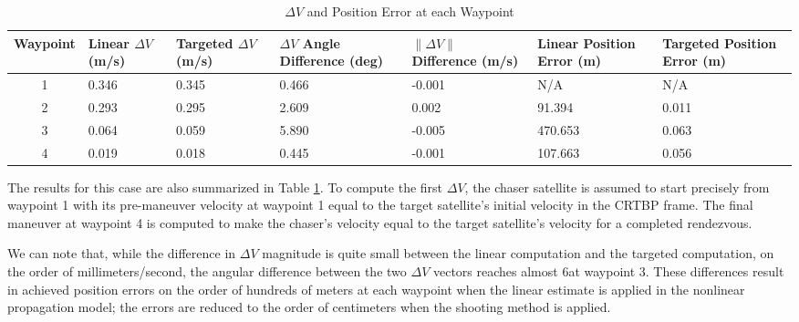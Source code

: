 \documentclass[a4paper]{article}
\begin{document}
\begin{table}[h] 
	\begin{center}
		\begin{tabular}{c p{1cm} p{1cm} p{1.5cm} p{1.5cm} p{1.5cm} p{1.5cm}}
			\toprule
			Waypoint   & Linear \(\Delta V\) (m/s) & Targeted \(\Delta V\) (m/s) & \(\Delta V\) Angle Difference (deg) & \(\|\Delta V \|\) Difference (m/s) & Linear Position Error (m) & Targeted Position Error (m) \\
			\midrule
			1 & 0.346 &	0.345 &	0.466 &	-0.001 &	N/A &	N/A \\
			2 & 0.293 &	0.295 &	2.609 &	0.002 &	91.394 &	0.011 \\
			3 & 0.064 &	0.059 &	5.890 &	-0.005 &	470.653 &	0.063 \\
			4 & 0.019 &	0.018 &	0.445 &	-0.001 &	107.663 &	0.056 \\
			\bottomrule
		\end{tabular}
		\caption{\(\Delta V\) and Position Error at each Waypoint}
		\label{tab:Results_1}
	\end{center}
\end{table}

The results for this case are also summarized in Table \ref{tab:Results_1}.  To compute the first \(\Delta V\), the chaser satellite is assumed to start precisely from waypoint 1 with its pre-maneuver velocity at waypoint 1 equal to the target satellite's initial velocity in the CRTBP frame.  The final maneuver at waypoint 4 is computed to make the chaser's velocity equal to the target satellite's velocity for a completed rendezvous.

We can note that, while the difference in \(\Delta V\) magnitude is quite small between the linear computation and the targeted computation, on the order of millimeters/second, the angular difference between the two \(\Delta V\) vectors reaches almost 6\textdegree at waypoint 3.  These differences result in achieved position errors on the order of hundreds of meters at each waypoint when the linear estimate is applied in the nonlinear propagation model; the errors are reduced to the order of centimeters when the shooting method is applied.

\end{document}
